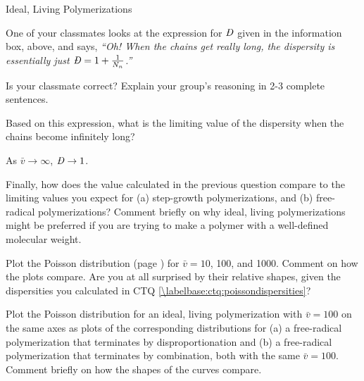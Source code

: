 \begin{activity}{Ideal, Living Polymerizations}
\begin{ctqs}
	\question One of your classmates looks at the expression for $\PDImath$ given in the information box, above, and says, \emph{``Oh!  When the chains get really long, the dispersity is essentially just $\PDImath = 1+\frac{1}{N_n}$.''}
	
		Is your classmate correct?  Explain your group's reasoning in 2-3 complete sentences.
		
		\begin{solution}[1.5in]
		\end{solution}
		
	\clearpage
	\question Based on this expression, what is the limiting value of the dispersity when the chains become infinitely long?
		
		\begin{solution}[0.5in]
			As $\bar v \to \infty$, $\PDImath \to 1$.
		\end{solution}
	
	\question Finally, how does the value calculated in the previous question compare to the limiting values you expect for (a) step-growth polymerizations, and (b) free-radical polymerizations?  Comment briefly on why ideal, living polymerizations might be preferred if you are trying to make a polymer with a well-defined molecular weight.
		
		\begin{solution}[1.5in]
		\end{solution}
	
\end{ctqs}



\begin{exercises}

	\exercise Plot the Poisson distribution (page \pageref{\labelbase:infobox:poisson}) for $\bar v = 10$, 100, and 1000.  Comment on how the plots compare.  Are you at all surprised by their relative shapes, given the dispersities you calculated in CTQ \ref{\labelbase:ctq:poissondispersities}?
	
	\exercise Plot the Poisson distribution for an ideal, living polymerization with $\bar v = 100$ on the same axes as plots of the corresponding distributions for (a) a free-radical polymerization that terminates by disproportionation and (b) a free-radical polymerization that terminates by combination, both with the same $\bar v =  100$.  Comment briefly on how the shapes of the curves compare.
	
\end{exercises}




%
%	


	
\end{activity}